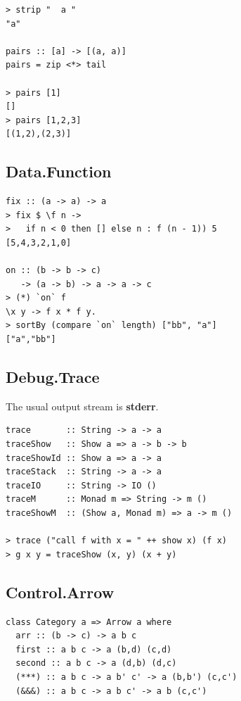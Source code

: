 \begin{multicols}{2}
\begin{box2}
\begin{verbatim}
> strip "  a "
"a"

pairs :: [a] -> [(a, a)]
pairs = zip <*> tail

> pairs [1]
[]
> pairs [1,2,3]
[(1,2),(2,3)]
\end{verbatim}
\end{box2}

\begin{box1}
\subsection *{Data.Function}
\begin{verbatim}
fix :: (a -> a) -> a
> fix $ \f n ->
>   if n < 0 then [] else n : f (n - 1)) 5
[5,4,3,2,1,0]

on :: (b -> b -> c)
   -> (a -> b) -> a -> a -> c
> (*) `on` f 
\x y -> f x * f y.
> sortBy (compare `on` length) ["bb", "a"]
["a","bb"]

\end{verbatim}
\end{box1}


\begin{box2}
\subsection *{Debug.Trace}

The usual output stream is \textbf{stderr}.

\begin{verbatim}
trace       :: String -> a -> a
traceShow   :: Show a => a -> b -> b
traceShowId :: Show a => a -> a
traceStack  :: String -> a -> a
traceIO     :: String -> IO ()
traceM      :: Monad m => String -> m ()
traceShowM  :: (Show a, Monad m) => a -> m ()

> trace ("call f with x = " ++ show x) (f x)
> g x y = traceShow (x, y) (x + y)
\end{verbatim}
\end{box2}

\begin{box1}
\subsection *{Control.Arrow}
\begin{verbatim}
class Category a => Arrow a where
  arr :: (b -> c) -> a b c
  first :: a b c -> a (b,d) (c,d)
  second :: a b c -> a (d,b) (d,c)
  (***) :: a b c -> a b' c' -> a (b,b') (c,c')
  (&&&) :: a b c -> a b c' -> a b (c,c')
\end{verbatim}
\end{box1}

\end{multicols}

